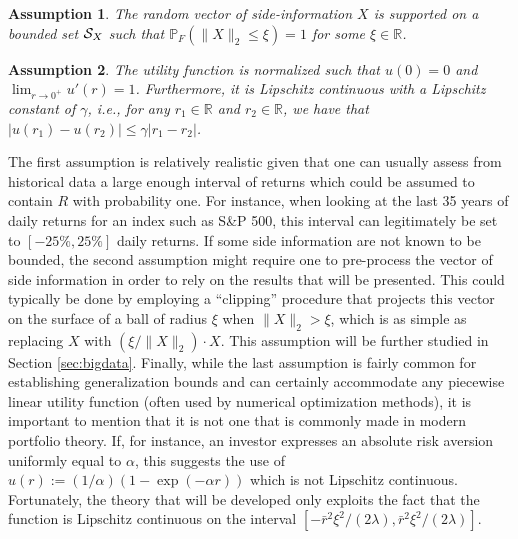 \documentclass[]{interact}
\theoremstyle{plain}%
\theoremstyle{definition}
\theoremstyle{remark}
\def\Prob{{\mathbb P}}
\newcommand{\0}{\V{0}}
\newcommand{\1}{\V{1}}
\renewcommand{\Re}{\mathbb{R}}
\newcommand{\quoteIt}[1]{``#1''}
\newcommand{\modified}[1]{{\color{blue} #1}}
\theoremstyle{plain}
\newtheorem{assumption}{Assumption}
\theoremstyle{definition}
\begin{document}
\begin{assumption}\label{ass:X}
\modified{  The random vector of side-information $X$ is supported on a bounded set ${\mathcal{S}_X}$ such that
  $\Prob_F(\|X\|_2\leq \xi)=1$ for some $\xi\in\Re$.}
\end{assumption}

\begin{assumption}\label{ass:u}
  The utility function is normalized such that $u(0)=0$ and $\lim_{r\to0^+}u'(r) =
  1$. Furthermore, it is Lipschitz continuous with a Lipschitz constant of $\gamma$, i.e.,
  for any $r_1\in\Re$ and $r_2\in\Re$, we have that
  $|u(r_1) - u(r_2)| \leq \gamma|r_1-r_2|$.
\end{assumption}

The first assumption is relatively realistic given that one can usually assess from
historical data a large enough interval of returns which could be assumed to contain $R$
with probability one. For instance, when looking at the last 35 years of daily returns for
an index such as S\&P 500, this interval can legitimately be set to $[-25\% , 25\%]$ daily
returns. If some side information are not known to be bounded, the second assumption might
require one to pre-process the vector of side information in order to rely on the results
that will be presented. This could typically be done by employing a \quoteIt{clipping} procedure that projects this vector on the
surface of a ball of radius $\xi$ when $\|X\|_2>\xi$, which is as simple as replacing $X$
with $(\xi/\|X\|_2)\cdot X$. This assumption will be further studied in Section
\ref{sec:bigdata}. Finally, while the last assumption is fairly common for establishing
generalization bounds and can certainly accommodate any piecewise linear utility function
(often used by numerical optimization methods), it is important to mention that it is not
one that is commonly made in modern portfolio theory. If, for instance, an investor
expresses an absolute risk aversion uniformly equal to $\alpha$, this suggests the use of
$u(r):=(1/\alpha)(1-\exp(-\alpha r))$ which is not Lipschitz continuous. Fortunately, the
theory that will be developed only exploits the fact that the function is Lipschitz continuous
on the interval $[-\bar{r}^2\xi^2/(2\lambda), \bar{r}^2\xi^2/(2\lambda)]$.

\end{document}
